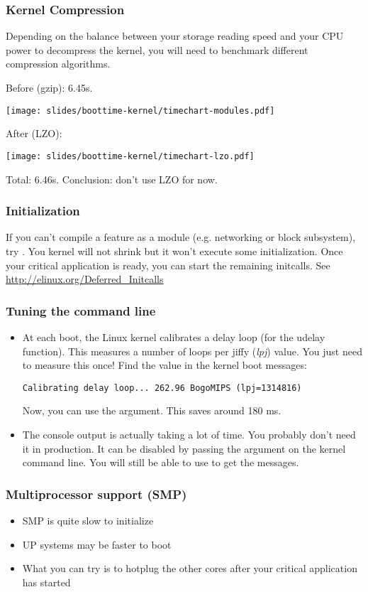 \begin{frame}
\frametitle{Kernel Compression}
Depending on the balance between your storage reading speed and your
CPU power to decompress the kernel, you will need to benchmark
different compression algorithms.

Before (gzip): 6.45s.
\begin{center}
    \texttt{[image: slides/boottime-kernel/timechart-modules.pdf]}
\end{center}
After (LZO):
\begin{center}
    \texttt{[image: slides/boottime-kernel/timechart-lzo.pdf]}
\end{center}
Total: 6.46s.
Conclusion: don't use LZO for now.
\end{frame}

\begin{frame}
\frametitle{Initialization}
If you can't compile a feature as a module (e.g. networking or block
subsystem), try . You kernel will not shrink
but it won't execute some initialization. Once your critical
application is ready, you can start the remaining initcalls. See
\url{http://elinux.org/Deferred_Initcalls}
\end{frame}

\begin{frame}[fragile]
\frametitle{Tuning the command line}
\begin{itemize}
	\item At each boot, the Linux kernel calibrates a delay loop (for
		the udelay function). This measures a number of loops per
		jiffy ({\em lpj}) value. You just need to measure this once! Find
		the  value in the kernel boot messages:
\begin{block}{}
\small
\begin{verbatim}
Calibrating delay loop... 262.96 BogoMIPS (lpj=1314816)
\end{verbatim}
\end{block}
		Now, you can use the  argument. This saves
		around 180 ms.
	\item The console output is actually taking a lot of time. You
		probably don't need it in production. It can be disabled by
		passing the  argument on the kernel command line.
		You will still be able to use  to get the
		messages.
\end{itemize}
\end{frame}

\begin{frame}
  \frametitle{Multiprocessor support (SMP)}
  \begin{itemize}
	  \item SMP is quite slow to initialize
	  \item UP systems may be faster to boot
	  \item What you can try is to hotplug the other cores after your critical application has started
  \end{itemize}
\end{frame}

